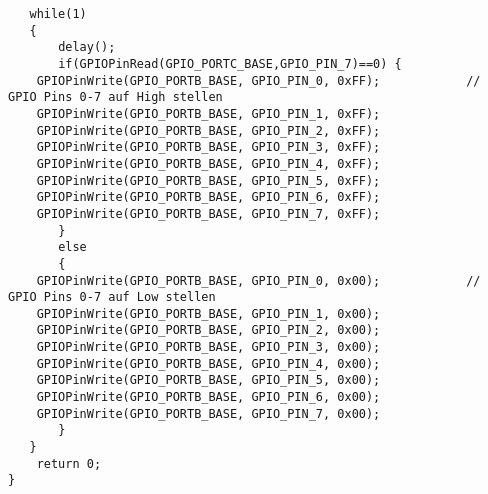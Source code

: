\begin{lstlisting}
   while(1)
   {
       delay();
       if(GPIOPinRead(GPIO_PORTC_BASE,GPIO_PIN_7)==0) {
    GPIOPinWrite(GPIO_PORTB_BASE, GPIO_PIN_0, 0xFF);            // GPIO Pins 0-7 auf High stellen
    GPIOPinWrite(GPIO_PORTB_BASE, GPIO_PIN_1, 0xFF);
    GPIOPinWrite(GPIO_PORTB_BASE, GPIO_PIN_2, 0xFF);
    GPIOPinWrite(GPIO_PORTB_BASE, GPIO_PIN_3, 0xFF);
    GPIOPinWrite(GPIO_PORTB_BASE, GPIO_PIN_4, 0xFF);
    GPIOPinWrite(GPIO_PORTB_BASE, GPIO_PIN_5, 0xFF);
    GPIOPinWrite(GPIO_PORTB_BASE, GPIO_PIN_6, 0xFF);
    GPIOPinWrite(GPIO_PORTB_BASE, GPIO_PIN_7, 0xFF);
       }
       else
       {
    GPIOPinWrite(GPIO_PORTB_BASE, GPIO_PIN_0, 0x00);            // GPIO Pins 0-7 auf Low stellen
    GPIOPinWrite(GPIO_PORTB_BASE, GPIO_PIN_1, 0x00);
    GPIOPinWrite(GPIO_PORTB_BASE, GPIO_PIN_2, 0x00);
    GPIOPinWrite(GPIO_PORTB_BASE, GPIO_PIN_3, 0x00);
    GPIOPinWrite(GPIO_PORTB_BASE, GPIO_PIN_4, 0x00);
    GPIOPinWrite(GPIO_PORTB_BASE, GPIO_PIN_5, 0x00);
    GPIOPinWrite(GPIO_PORTB_BASE, GPIO_PIN_6, 0x00);
    GPIOPinWrite(GPIO_PORTB_BASE, GPIO_PIN_7, 0x00);
       }
   }
    return 0;
}
\end{lstlisting}

\subsubsection{}

